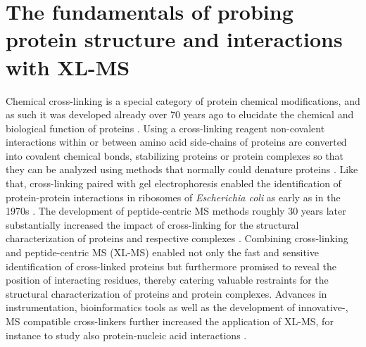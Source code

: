 \section{The fundamentals of probing protein structure and interactions with XL-MS}
Chemical cross-linking is a special category of protein chemical modifications, and as such it was developed already over 70 years ago to elucidate the chemical and biological function of proteins \cite{French_1945}. Using a cross-linking reagent non-covalent interactions within or between amino acid side-chains of proteins are converted into covalent chemical bonds, stabilizing proteins or protein complexes so that they can be analyzed using methods that normally could denature proteins \cite{Means_1998, Naowarojna_2021}. Like that, cross-linking paired with gel electrophoresis enabled the identification of protein-protein interactions in ribosomes of \emph{Escherichia coli} as early as in the 1970s \cite{Clegg_1974, Sun_1974}. The development of peptide-centric MS methods roughly 30 years later substantially increased the impact of cross-linking for the structural characterization of proteins and respective complexes \cite{Rappsilber_2011, Rappsilber_2000}. Combining cross-linking and peptide-centric MS (XL-MS) enabled not only the fast and sensitive identification of cross-linked proteins but furthermore promised to reveal the position of interacting residues, thereby catering valuable restraints for the structural characterization of proteins and protein complexes. Advances in instrumentation, bioinformatics tools as well as the development of innovative-, MS compatible cross-linkers further increased the application of XL-MS, for instance to study also protein-nucleic acid interactions \cite{Gotze_2021, Wong_1991}.


